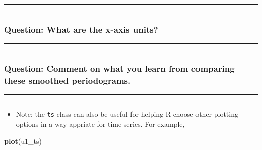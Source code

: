 \documentclass[]{article}
\newenvironment{Shaded}{\begin{snugshade}}{\end{snugshade}}
\newcommand{\KeywordTok}[1]{\textcolor[rgb]{0.13,0.29,0.53}{\textbf{#1}}}
\newcommand{\NormalTok}[1]{#1}
\providecommand{\tightlist}{%
  \setlength{\itemsep}{0pt}\setlength{\parskip}{0pt}}
\begin{document}
\begin{center}\rule{0.5\linewidth}{\linethickness}\end{center}

\begin{center}\rule{0.5\linewidth}{\linethickness}\end{center}

\subsubsection{Question: What are the x-axis
units?}\label{question-what-are-the-x-axis-units}


\begin{center}\rule{0.5\linewidth}{\linethickness}\end{center}

\begin{center}\rule{0.5\linewidth}{\linethickness}\end{center}

\subsubsection{Question: Comment on what you learn from comparing these
smoothed
periodograms.}\label{question-comment-on-what-you-learn-from-comparing-these-smoothed-periodograms.}

\begin{center}\rule{0.5\linewidth}{\linethickness}\end{center}

\begin{center}\rule{0.5\linewidth}{\linethickness}\end{center}

\begin{itemize}
\tightlist
\item
  Note: the \texttt{ts} class can also be useful for helping R choose
  other plotting options in a way appriate for time series. For example,
\end{itemize}

\begin{Shaded}
\begin{Highlighting}[]
\KeywordTok{plot}\NormalTok{(u1_ts)}
\end{Highlighting}
\end{Shaded}
\end{document}
